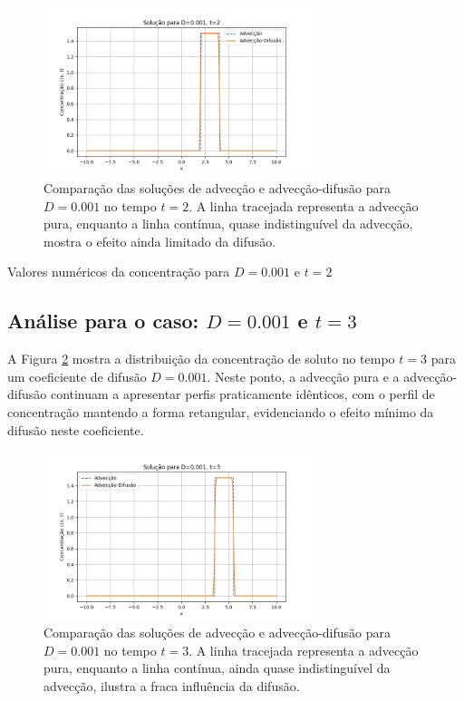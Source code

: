 \begin{figure}[H]
    \centering
    \includegraphics[width=0.7\textwidth]{code/plot/Advec_Difus_t2_D0.001.png}
    \caption{Comparação das soluções de advecção e advecção-difusão para \( D = 0.001 \) no tempo \( t = 2 \). A linha tracejada representa a advecção pura, enquanto a linha contínua, quase indistinguível da advecção, mostra o efeito ainda limitado da difusão.}
    \label{fig:advec_diffus_0.001_t2}
\end{figure}

\begin{table}[H]
    \centering
    \caption{Valores numéricos da concentração para \( D = 0.001 \) e \( t = 2 \)}
    
\end{table}

\subsection*{Análise para o caso: \( D = 0.001 \) e \( t = 3 \)}

A Figura \ref{fig:advec_diffus_0.001_t3} mostra a distribuição da concentração de soluto no tempo \( t = 3 \) para um coeficiente de difusão \( D = 0.001 \). Neste ponto, a advecção pura e a advecção-difusão continuam a apresentar perfis praticamente idênticos, com o perfil de concentração mantendo a forma retangular, evidenciando o efeito mínimo da difusão neste coeficiente.

\begin{figure}[H]
    \centering
    \includegraphics[width=0.7\textwidth]{code/plot/Advec_Difus_t3_D0.001.png}
    \caption{Comparação das soluções de advecção e advecção-difusão para \( D = 0.001 \) no tempo \( t = 3 \). A linha tracejada representa a advecção pura, enquanto a linha contínua, ainda quase indistinguível da advecção, ilustra a fraca influência da difusão.}
    \label{fig:advec_diffus_0.001_t3}
\end{figure}

